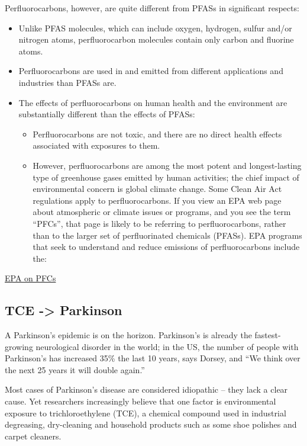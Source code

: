 \documentclass[
]{book}
\providecommand{\tightlist}{%
  \setlength{\itemsep}{0pt}\setlength{\parskip}{0pt}}
\begin{document}
Perfluorocarbons, however, are quite different from PFASs in significant respects:

\begin{itemize}
\tightlist
\item
  Unlike PFAS molecules, which can include oxygen, hydrogen, sulfur and/or nitrogen atoms, perfluorocarbon molecules contain only carbon and fluorine atoms.
\item
  Perfluorocarbons are used in and emitted from different applications and industries than PFASs are.
\item
  The effects of perfluorocarbons on human health and the environment are substantially different than the effects of PFASs:

  \begin{itemize}
  \item
    Perfluorocarbons are not toxic, and there are no direct health effects associated with exposures to them.
  \item
    However, perfluorocarbons are among the most potent and longest-lasting type of greenhouse gases emitted by human activities; the chief impact of environmental concern is global climate change. Some Clean Air Act regulations apply to perfluorocarbons. If you view an EPA web page about atmospheric or climate issues or programs, and you see the term ``PFCs'', that page is likely to be referring to perfluorocarbons, rather than to the larger set of perfluorinated chemicals (PFASs). EPA programs that seek to understand and reduce emissions of perfluorocarbons include the:
  \end{itemize}
\end{itemize}

\href{https://www.epa.gov/pfas/what-are-pfcs-and-how-do-they-relate-and-polyfluoroalkyl-substances-pfass}{EPA on PFCs}

\hypertarget{tce---parkinson}{%
\subsection{TCE -\textgreater{} Parkinson}\label{tce---parkinson}}

A Parkinson's epidemic is on the horizon. Parkinson's is already the fastest-growing neurological disorder in the world; in the US, the number of people with Parkinson's has increased 35\% the last 10 years, says Dorsey, and ``We think over the next 25 years it will double again.''

Most cases of Parkinson's disease are considered idiopathic -- they lack a clear cause. Yet researchers increasingly believe that one factor is environmental exposure to trichloroethylene (TCE), a chemical compound used in industrial degreasing, dry-cleaning and household products such as some shoe polishes and carpet cleaners.
\end{document}
